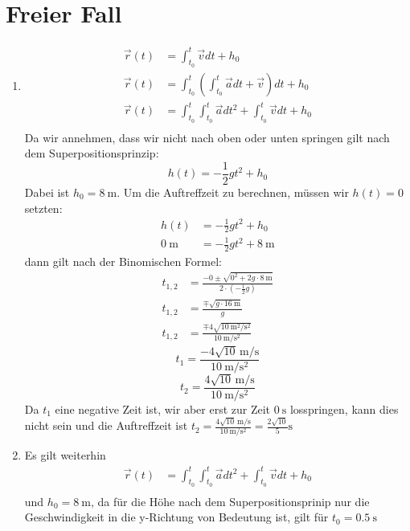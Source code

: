 \documentclass[sectionformat = aufgabe]{gadsescript}
\begin{document}
\section{Freier Fall}
\begin{enumerate}[label=\alph*)]
	\item 
		\begin{align*}
			\vec r(t) &= \int_{t_0}^{t} \vec v dt + h_0\\
			\vec r(t) &= \int_{t_0}^{t} \left(\int_{t_0}^{t} \vec a dt + \vec v \right) dt + h_0\\
			\vec r(t) &= \int_{t_0}^{t} \int_{t_0}^{t} \vec a dt^2 + \int_{t_0}^{t} \vec v dt + h_0\\
		\end{align*}
		Da wir annehmen, dass wir nicht nach oben oder unten springen gilt nach dem Superpositionsprinzip:
			\[h(t) = -\frac{1}{2}gt^2 + h_0\]
		Dabei ist $h_0 = \qty{8}{\metre}$. Um die Auftreffzeit zu berechnen, müssen wir $ h(t) = 0 $ setzten:
		\begin{align*}
			h(t) &= -\frac{1}{2}gt^2 + h_0\\
			\qty{0}{\metre} &= -\frac{1}{2}gt^2 + \qty{8}{\metre}
		\end{align*}
		dann gilt nach der Binomischen Formel:
		\begin{align*}
			t_{1,2} &= \frac{-0 \pm \sqrt{0^2 + 2g\cdot \qty{8}{\metre}}}{2\cdot \left(-\frac{1}{2}g\right)}\\
			t_{1,2} &= \frac{\mp \sqrt{g \cdot \qty{16}{\metre}}}{g}\\
			t_{1,2} &= \frac{\mp 4\sqrt{\qty{10}{\square\metre\per\square\second}}}{\qty{10}{\metre\per\square\second}}
		\end{align*}
		\[ t_1 = \frac{- 4\sqrt{10}\,\unit{\metre\per\second}}{\qty{10}{\metre\per\square\second}} \]
		\[ t_2 = \frac{4\sqrt{10}\,\unit{\metre\per\second}}{\qty{10}{\metre\per\square\second}} \]
		Da $ t_1 $ eine negative Zeit ist, wir aber erst zur Zeit $ \qty{0}{\second} $ losspringen, kann dies nicht sein und die Auftreffzeit ist $ t_2 = \frac{4\sqrt{10}\,\unit{\metre\per\second}}{\qty{10}{\metre\per\square\second}} = \frac{2\sqrt{10}}{5}\unit{\second}$
	\item Es gilt weiterhin
		\begin{align*}
			\vec r(t) &= \int_{t_0}^{t} \int_{t_0}^{t} \vec a dt^2 + \int_{t_0}^{t} \vec v dt + h_0\\
		\end{align*}
		und $ h_0 = \qty{8}{\metre} $, da für die Höhe nach dem Superpositionsprinip nur die Geschwindigkeit in die y-Richtung von Bedeutung ist, gilt für $ t_0 = \qty{0.5}{\second} $

\end{enumerate}
\end{document}
